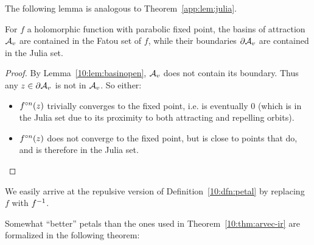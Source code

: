 \documentclass[../main.tex]{subfiles}
\begin{document}
The following lemma is analogous to Theorem~\ref{app:lem:julia}.

\begin{lem}
    \label{10:lem:jf}
    For $f$ a holomorphic function with parabolic fixed point, the basins of attraction $\mathcal{A}_v$ are contained in the Fatou set of $f$, while their boundaries $\partial\mathcal{A}_v$ are contained in the Julia set.
\end{lem}
\begin{proof}
    By Lemma~\ref{10:lem:basinopen}, $\mathcal{A}_v$ does not contain its boundary. Thus any $z\in\partial\mathcal{A}_v$ is not in $\mathcal{A}_v$. So either: 
    \begin{itemize}
        \item $f^{\circ n}(z)$ trivially converges to the fixed point, i.e. is eventually 0 (which is in the Julia set due to its proximity to both attracting and repelling orbits). 
        \item $f^{\circ n}(z)$ does not converge to the fixed point, but is close to points that do, and is therefore in the Julia set.
    \end{itemize}
\end{proof}

We easily arrive at the repulsive version of Definition~\ref{10:dfn:petal} by replacing $f$ with ${f}^{-1}$.

Somewhat ``better'' petals than the ones used in Theorem~\ref{10:thm:arvec-ir} are formalized in the following theorem: 
\end{document}
